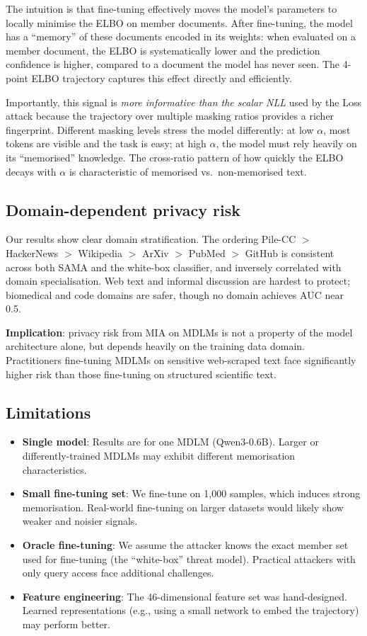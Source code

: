 \documentclass[11pt,a4paper]{article}
\begin{document}
The intuition is that fine-tuning effectively moves the model's parameters to
locally minimise the ELBO on member documents. After fine-tuning, the model
has a ``memory'' of these documents encoded in its weights: when evaluated on
a member document, the ELBO is systematically lower and the prediction
confidence is higher, compared to a document the model has never seen.
The 4-point ELBO trajectory captures this effect directly and efficiently.

Importantly, this signal is \emph{more informative than the scalar NLL}
used by the Loss attack because the trajectory over multiple masking ratios
provides a richer fingerprint. Different masking levels stress the model
differently: at low $\alpha$, most tokens are visible and the task is easy;
at high $\alpha$, the model must rely heavily on its ``memorised'' knowledge.
The cross-ratio pattern of how quickly the ELBO decays with $\alpha$ is
characteristic of memorised vs.\ non-memorised text.

\subsection{Domain-dependent privacy risk}

Our results show clear domain stratification. The ordering
Pile-CC $>$ HackerNews $>$ Wikipedia $>$ ArXiv $>$ PubMed $>$ GitHub
is consistent across both SAMA and the white-box classifier, and inversely
correlated with domain specialisation. Web text and informal discussion are
hardest to protect; biomedical and code domains are safer, though no domain
achieves AUC near 0.5.

\textbf{Implication}: privacy risk from MIA on MDLMs is not a property of
the model architecture alone, but depends heavily on the training data domain.
Practitioners fine-tuning MDLMs on sensitive web-scraped text face significantly
higher risk than those fine-tuning on structured scientific text.

\subsection{Limitations}

\begin{itemize}[nosep]
  \item \textbf{Single model}: Results are for one MDLM (Qwen3-0.6B). Larger or differently-trained MDLMs may exhibit different memorisation characteristics.
  \item \textbf{Small fine-tuning set}: We fine-tune on 1{,}000 samples, which induces strong memorisation. Real-world fine-tuning on larger datasets would likely show weaker and noisier signals.
  \item \textbf{Oracle fine-tuning}: We assume the attacker knows the exact member set used for fine-tuning (the ``white-box'' threat model). Practical attackers with only query access face additional challenges.
  \item \textbf{Feature engineering}: The 46-dimensional feature set was hand-designed. Learned representations (e.g., using a small network to embed the trajectory) may perform better.
\end{itemize}
\end{document}

